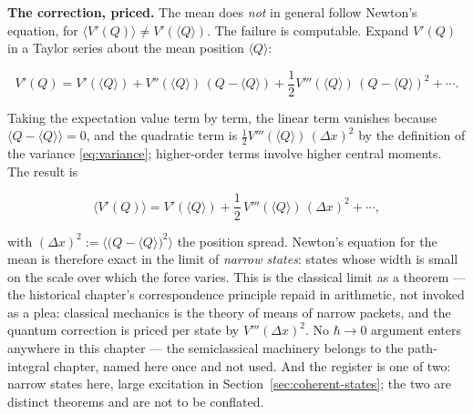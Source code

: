 \textbf{The correction, priced.} The mean does \emph{not} in general follow Newton's equation, for $\langle V'(Q)\rangle \neq V'(\langle Q\rangle)$. The failure is computable. Expand $V'(Q)$ in a Taylor series about the mean position $\langle Q\rangle$:
\begin{linenomath}
    \begin{equation*}
        V'(Q) = V'(\langle Q\rangle) + V''(\langle Q\rangle)\,(Q-\langle Q\rangle) + \frac{1}{2}V'''(\langle Q\rangle)\,(Q-\langle Q\rangle)^2 + \cdots .
    \end{equation*}
\end{linenomath}
Taking the expectation value term by term, the linear term vanishes because $\langle Q-\langle Q\rangle\rangle = 0$, and the quadratic term is $\tfrac12 V'''(\langle Q\rangle)\,(\Delta x)^2$ by the definition of the variance \eqref{eq:variance}; higher-order terms involve higher central moments. The result is
\begin{linenomath}
    \begin{equation}
        \bigl\langle V'(Q)\bigr\rangle = V'(\langle Q\rangle) + \frac{1}{2}\,V'''(\langle Q\rangle)\,(\Delta x)^2 + \cdots,
        \label{eq:ehrenfest-correction}
    \end{equation}
\end{linenomath}
with $(\Delta x)^2 := \bigl\langle\bigl(Q - \langle Q\rangle\bigr)^2\bigr\rangle$ the position spread. Newton's equation for the mean is therefore exact in the limit of \emph{narrow states}: states whose width is small on the scale over which the force varies. This is the classical limit as a theorem --- the historical chapter's correspondence principle repaid in arithmetic, not invoked as a plea: classical mechanics is the theory of means of narrow packets, and the quantum correction is priced per state by $V'''(\Delta x)^2$. No $\hbar \to 0$ argument enters anywhere in this chapter --- the semiclassical machinery belongs to the path-integral chapter, named here once and not used. And the register is one of two: narrow states here, large excitation in Section~\ref{sec:coherent-states}; the two are distinct theorems and are not to be conflated.


